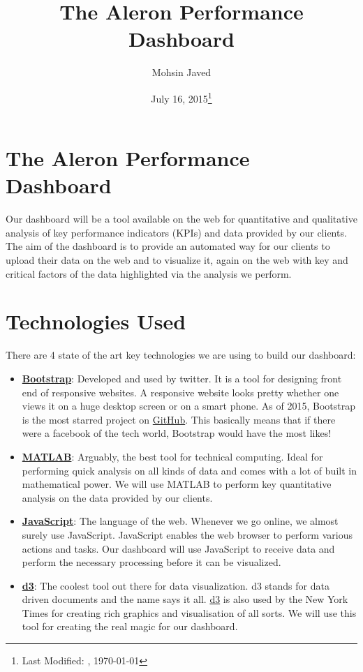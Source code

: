 \documentclass[a4paper]{article}
\begin{document}
\title{The Aleron Performance Dashboard}
\author{Mohsin Javed}
\date{July 16, 2015\footnote{Last Modified: \currenttime, \today }}
\maketitle
\section*{The Aleron Performance Dashboard}
Our dashboard will be a tool available on the web for
quantitative and qualitative analysis of key performance
indicators (KPIs) and data provided by our clients. The aim
of the dashboard is to provide an automated way for our
clients to upload their data on the web and to visualize it,
again on the web with key and critical factors of the data
highlighted via the analysis we perform.


\section*{Technologies Used}
There are 4 state of the art key technologies we are using
to build our dashboard:
\begin{itemize}
\item
\href{https://en.wikipedia.org/wiki/Bootstrap_(front-end_framework)}{\textbf{Bootstrap}}:
Developed and used by twitter. It is a tool
for designing front end of responsive websites. A responsive
website looks pretty whether one views it on a huge desktop
screen or on a smart phone. As of 2015, Bootstrap is the
most starred project on \href{https://github.com/}{GitHub}.
This basically means that if there were a facebook of the
tech world, Bootstrap would have the most likes!
\item \href{http://uk.mathworks.com/}{\textbf{MATLAB}}: Arguably, the
best tool for technical computing. Ideal for performing
quick analysis on all kinds of data and comes with a lot of
built in mathematical power. We will use MATLAB to perform
key quantitative analysis on the data provided by our
clients.
\item
\href{https://en.wikipedia.org/wiki/JavaScript}{\textbf{JavaScript}}: 
The language of the web. Whenever we go
online, we almost surely use JavaScript. JavaScript enables
the web browser to perform various actions and tasks. Our
dashboard will use JavaScript to receive data and perform
the necessary processing before it can be visualized. 
\item \href{http://d3js.org}{\textbf{d3}}: The coolest tool out there
for data visualization. d3 stands for data driven documents
and the name says it all. \href{http://d3js.org}{d3} is also 
used by the New York Times for creating rich graphics and
visualisation of all sorts. We will use this tool for
creating the real magic for our dashboard.
\end{itemize}
\end{document}
